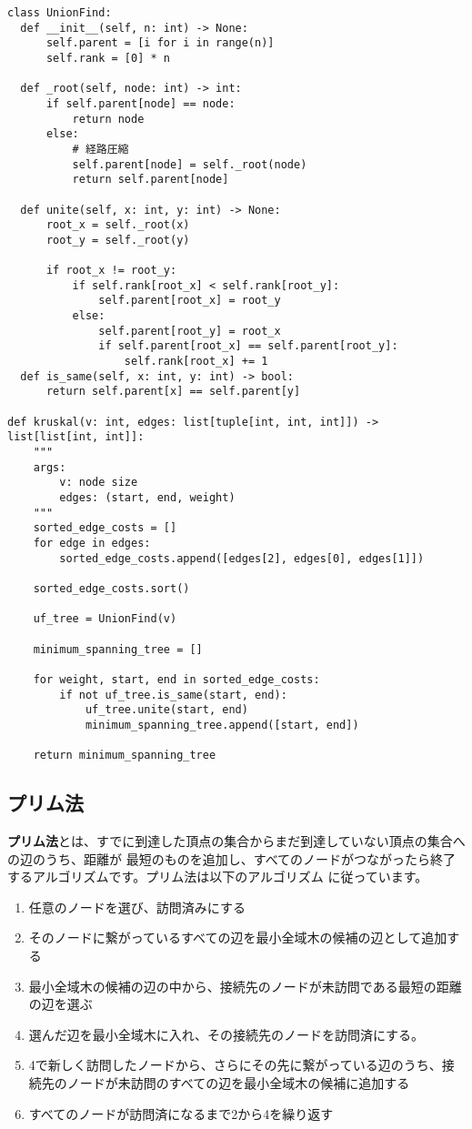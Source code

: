 \documentclass{jlreq}
\begin{document}
\begin{lstlisting}[caption=クラスカル法の実装, label=kruskal, frame=TRBL, label={kruskal}]
class UnionFind:
  def __init__(self, n: int) -> None:
      self.parent = [i for i in range(n)]
      self.rank = [0] * n
  
  def _root(self, node: int) -> int:
      if self.parent[node] == node:
          return node
      else:
          # 経路圧縮
          self.parent[node] = self._root(node)
          return self.parent[node]
  
  def unite(self, x: int, y: int) -> None:
      root_x = self._root(x)
      root_y = self._root(y)
      
      if root_x != root_y:
          if self.rank[root_x] < self.rank[root_y]:
              self.parent[root_x] = root_y
          else:
              self.parent[root_y] = root_x
              if self.parent[root_x] == self.parent[root_y]:
                  self.rank[root_x] += 1
  def is_same(self, x: int, y: int) -> bool:
      return self.parent[x] == self.parent[y]

def kruskal(v: int, edges: list[tuple[int, int, int]]) -> list[list[int, int]]:
    """
    args:
        v: node size
        edges: (start, end, weight)
    """
    sorted_edge_costs = []
    for edge in edges:
        sorted_edge_costs.append([edges[2], edges[0], edges[1]])
    
    sorted_edge_costs.sort()
    
    uf_tree = UnionFind(v)
    
    minimum_spanning_tree = []
    
    for weight, start, end in sorted_edge_costs:
        if not uf_tree.is_same(start, end):
            uf_tree.unite(start, end)
            minimum_spanning_tree.append([start, end])
    
    return minimum_spanning_tree
\end{lstlisting}

\newpage

\subsection{プリム法}
\textbf{プリム法}とは、すでに到達した頂点の集合からまだ到達していない頂点の集合への辺のうち、距離が
最短のものを追加し、すべてのノードがつながったら終了するアルゴリズムです。プリム法は以下のアルゴリズム
に従っています。

\begin{enumerate}
  \item 任意のノードを選び、訪問済みにする
  \item そのノードに繋がっているすべての辺を最小全域木の候補の辺として追加する
  \item 最小全域木の候補の辺の中から、接続先のノードが未訪問である最短の距離の辺を選ぶ
  \item 選んだ辺を最小全域木に入れ、その接続先のノードを訪問済にする。 
  \item 4で新しく訪問したノードから、さらにその先に繋がっている辺のうち、接続先のノードが未訪問のすべての辺を最小全域木の候補に追加する
  \item すべてのノードが訪問済になるまで2から4を繰り返す
\end{enumerate}
\end{document}
